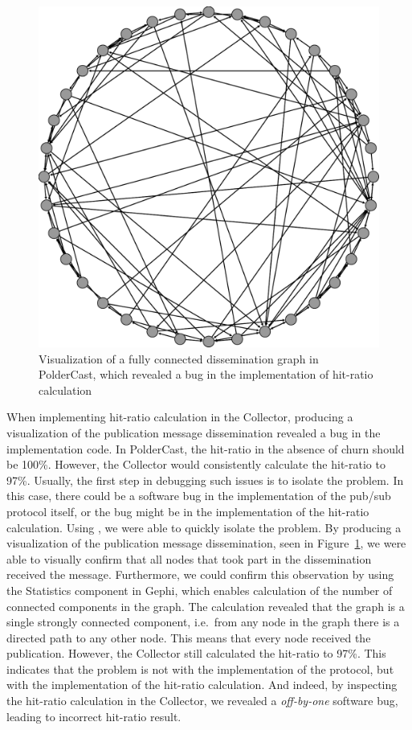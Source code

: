 \begin{figure}[ht!]
    \centering
    \includegraphics[width=\linewidth]{figures/hitratiobug}
    \caption{Visualization of a fully connected dissemination graph in
        PolderCast, which revealed a bug in the implementation of hit-ratio
        calculation}
   \label{fig:hitratiobug}
\end{figure}

When implementing hit-ratio calculation in the Collector, producing a
visualization of the publication message dissemination revealed a bug in the implementation code.
In PolderCast, the hit-ratio in the absence of churn should be 100\%.
However, the Collector would consistently calculate the hit-ratio to
97\%. Usually, the first step in debugging such issues is to isolate the
problem. In this case, there could be a software bug in the
implementation of the pub/sub protocol itself, or the bug might be in
the implementation of the hit-ratio calculation. Using \demo, we were
able to quickly isolate the problem. By producing a visualization of the
publication message dissemination, seen in Figure~\ref{fig:hitratiobug},
we were able to visually confirm that all nodes that took part in the dissemination
received the message. Furthermore, we could confirm this observation by
using the Statistics component in Gephi, which enables calculation of
the number of connected components in the graph.  The calculation
revealed that the graph is a single strongly connected component, i.e.\
from any node in the graph there is a directed path to any other node.
This means that every node received the publication. However, the
Collector still calculated the hit-ratio to 97\%. This indicates that
the problem is not with the implementation of the protocol, but with the
implementation of the hit-ratio calculation. And indeed, by inspecting
the hit-ratio calculation in the Collector, we revealed a
\emph{off-by-one} software bug, leading to incorrect hit-ratio result.

